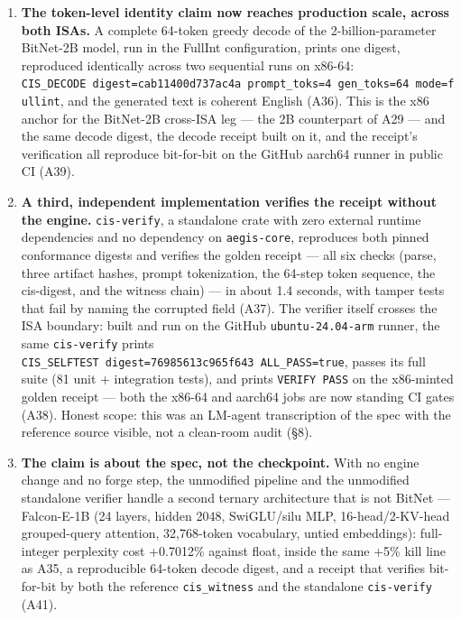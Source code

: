 \documentclass[11pt]{article}
\begin{document}
\begin{enumerate}
  integer-dominant hybrid path (attention still in floating point) costs +0.7408\% on a
  2-billion-parameter ternary model (A21), and the complete all-integer forward pass on the same
  2B model costs +0.1239\% --- closer to float than the hybrid figure, and 40× inside the kill line
  (A35). The first all-integer run at this scale panicked instead: a NORMQ precondition rejected
  an out-of-range residual, tracing to a gap in spec §5.10, where the ACT-I MLP nonlinearity was
  the one op not carrying the spec §5.6 per-vector block exponent that the hybrid boundary already
  applied. The fix --- an RNE-rounded block exponent on the ACT-I output --- is ratified as spec
  erratum v1.0.3; both pinned conformance digests are unchanged.
\item
  \textbf{The token-level identity claim now reaches production scale, across both ISAs.} A complete
  64-token greedy decode of the 2-billion-parameter BitNet-2B model, run in the FullInt
  configuration, prints one digest, reproduced identically across two sequential runs on x86-64:
  \texttt{CIS\_DECODE\ digest=cab11400d737ac4a\ prompt\_toks=4\ gen\_toks=64\ mode=fullint}, and the generated
  text is coherent English (A36). This is the x86 anchor for the BitNet-2B cross-ISA leg --- the 2B
  counterpart of A29 --- and the same decode digest, the decode receipt built on it, and the
  receipt's verification all reproduce bit-for-bit on the GitHub aarch64 runner in public CI (A39).
\item
  \textbf{A third, independent implementation verifies the receipt without the engine.}
  \texttt{cis-verify}, a standalone crate with zero external runtime dependencies and no dependency on
  \texttt{aegis-core}, reproduces both pinned conformance digests and verifies the golden receipt --- all
  six checks (parse, three artifact hashes, prompt tokenization, the 64-step token sequence, the
  cis-digest, and the witness chain) --- in about 1.4 seconds, with tamper tests that fail by naming
  the corrupted field (A37). The verifier itself crosses the ISA boundary: built and run on the
  GitHub \texttt{ubuntu-24.04-arm} runner, the same \texttt{cis-verify} prints
  \texttt{CIS\_SELFTEST\ digest=76985613c965f643\ ALL\_PASS=true}, passes its full suite (81 unit +
  integration tests), and prints \texttt{VERIFY\ PASS} on the x86-minted golden receipt --- both the x86-64
  and aarch64 jobs are now standing CI gates (A38). Honest scope: this was an LM-agent
  transcription of the spec with the reference source visible, not a clean-room audit (§8).
\item
  \textbf{The claim is about the spec, not the checkpoint.} With no engine change and no forge step,
  the unmodified pipeline and the unmodified standalone verifier handle a second ternary
  architecture that is not BitNet --- Falcon-E-1B (24 layers, hidden 2048, SwiGLU/silu MLP,
  16-head/2-KV-head grouped-query attention, 32,768-token vocabulary, untied embeddings):
  full-integer perplexity cost +0.7012\% against float, inside the same +5\% kill line as A35, a
  reproducible 64-token decode digest, and a receipt that verifies bit-for-bit by both the
  reference \texttt{cis\_witness} and the standalone \texttt{cis-verify} (A41).
\end{enumerate}
\end{document}
